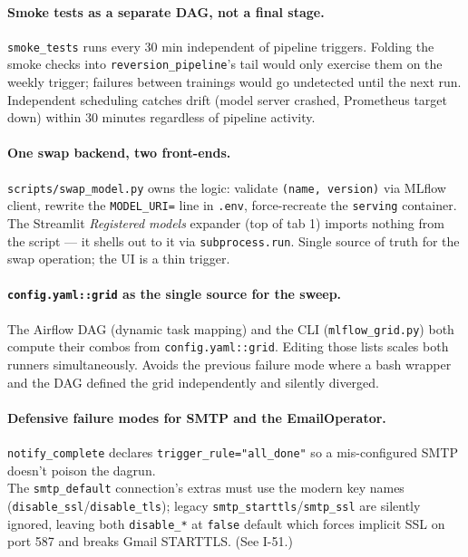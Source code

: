 \documentclass[11pt,a4paper]{article}
\begin{document}
\paragraph{Smoke tests as a separate DAG, not a final stage.}
\texttt{smoke\_tests} runs every 30 min independent of pipeline triggers. Folding the smoke checks into \texttt{reversion\_pipeline}'s tail would only exercise them on the weekly trigger; failures between trainings would go undetected until the next run. Independent scheduling catches drift (model server crashed, Prometheus target down) within 30 minutes regardless of pipeline activity.

\paragraph{One swap backend, two front-ends.}
\texttt{scripts/swap\_model.py} owns the logic: validate \texttt{(name, version)} via MLflow client, rewrite the \texttt{MODEL\_URI=} line in \texttt{.env}, force-recreate the \texttt{serving} container. The Streamlit \emph{Registered models} expander (top of tab 1) imports nothing from the script --- it shells out to it via \texttt{subprocess.run}. Single source of truth for the swap operation; the UI is a thin trigger.

\paragraph{\texttt{config.yaml::grid} as the single source for the sweep.}
The Airflow DAG (dynamic task mapping) and the CLI (\texttt{mlflow\_grid.py}) both compute their combos from \texttt{config.yaml::grid}. Editing those lists scales both runners simultaneously. Avoids the previous failure mode where a bash wrapper and the DAG defined the grid independently and silently diverged.

\paragraph{Defensive failure modes for SMTP and the EmailOperator.}
\texttt{notify\_complete} declares \texttt{trigger\_rule="all\_done"} so a mis-configured SMTP doesn't poison the dagrun.
\\
The \texttt{smtp\_default} connection's extras must use the modern key names (\texttt{disable\_ssl}/\texttt{disable\_tls}); legacy \texttt{smtp\_starttls}/\texttt{smtp\_ssl} are silently ignored, leaving both \texttt{disable\_*} at \texttt{false} default which forces implicit SSL on port 587 and breaks Gmail STARTTLS. (See I-51.)
\end{document}
